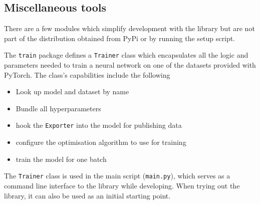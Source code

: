 \hypertarget{sec:other-tools}{%
\subsection{Miscellaneous tools}\label{sec:other-tools}}

There are a few modules which simplify development with the library but are not
part of the distribution obtained from PyPi or by running the setup script.

The \texttt{train} package defines a \texttt{Trainer} class which encapsulates
all the logic and parameters needed to train a neural network on one of the
datasets provided with PyTorch. The class's capabilities include the following

\begin{itemize}
    \item
        Look up model and dataset by name
    \item
        Bundle all hyperparameters
    \item
        hook the \texttt{Exporter} into the model for
        publishing data
    \item
        configure the optimisation algorithm to use for training
    \item
        train the model for one batch
\end{itemize}

The \texttt{Trainer} class is used in the main script
(\texttt{main.py}), which serves as a command line
interface to the library while developing. When trying out the library,
it can also be used as an initial starting point.

